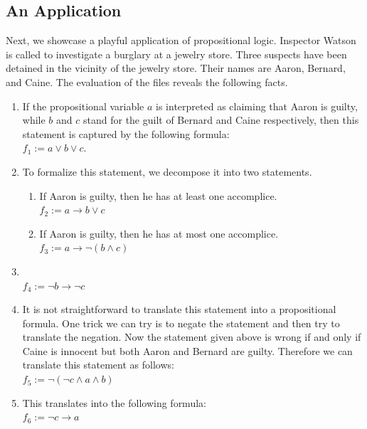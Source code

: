 \subsection{An Application}
Next, we showcase a playful application of propositional logic.  Inspector Watson is called to investigate a
burglary at a jewelry store.  Three suspects have been detained in the vicinity of the jewelry store.
Their names are Aaron, Bernard, and Caine.  The evaluation of the files reveals the following facts.
\begin{enumerate}
\item {}

      If the propositional variable $a$ is interpreted as claiming that Aaron is guilty, while $b$ and $c$
      stand for the guilt of Bernard and Caine respectively, then this statement is captured by the following formula: 
      \\[0.2cm]
      \hspace*{1.3cm} 
      $f_1 := a \vee b \vee c$.
\item {}
      
      To formalize this statement, we decompose it into two statements.
      \begin{enumerate}
      \item If Aaron is guilty, then he has at least one accomplice. \\[0.2cm]
            \hspace*{1.3cm} $f_2 := a \rightarrow b \vee c$ 
      \item If Aaron is guilty, then he has at most one accomplice. \\[0.2cm]
           \hspace*{1.3cm} $f_3 := a \rightarrow \neg (b \wedge c)$
      \end{enumerate}
\item {} \\[0.2cm]
      \hspace*{1.3cm} $f_4 :=  \neg b \rightarrow \neg c$ 
\item {}

      It is not straightforward to translate this statement into a propositional formula.
      One trick we can try is to negate the statement and then try to translate the negation.
      Now the statement given above is wrong if and only if Caine is innocent but both Aaron and Bernard are guilty.
      Therefore we can translate this statement as follows: \\[0.2cm]
      \hspace*{1.3cm} $f_5 := \neg ( \neg c  \wedge a \wedge b )$ 
\item {} 

      This translates into the following formula:\\[0.2cm]
      \hspace*{1.3cm} $f_6 := \neg c \rightarrow a$
\end{enumerate}
